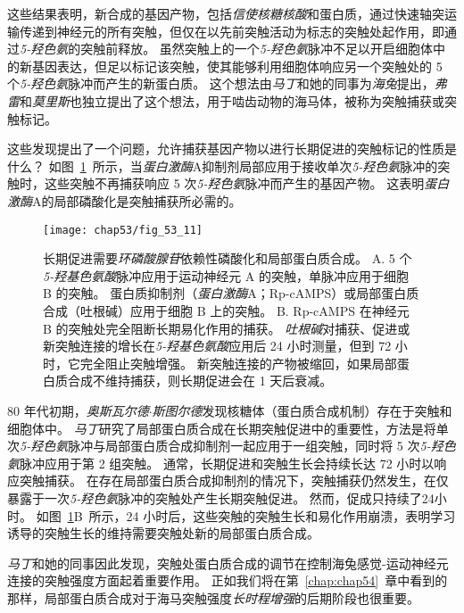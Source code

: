 这些结果表明，新合成的基因产物，包括\textit{信使核糖核酸}和蛋白质，通过快速轴突运输传递到神经元的所有突触，但仅在以先前突触活动为标志的突触处起作用，即通过\textit{5-羟色氨}的突触前释放。
虽然突触上的一个\textit{5-羟色氨}脉冲不足以开启细胞体中的新基因表达，但足以标记该突触，使其能够利用细胞体响应另一个突触处的 5 个\textit{5-羟色氨}脉冲而产生的新蛋白质。
这个想法由\textit{马丁}和她的同事为\textit{海兔}提出，\textit{弗雷}和\textit{莫里斯}也独立提出了这个想法，用于啮齿动物的海马体，被称为突触捕获或突触标记。


这些发现提出了一个问题，允许捕获基因产物以进行长期促进的突触标记的性质是什么？
如图~\ref{fig:53_11}~所示，当\textit{蛋白激酶}A抑制剂局部应用于接收单次\textit{5-羟色氨}脉冲的突触时，这些突触不再捕获响应 5 次\textit{5-羟色氨}脉冲而产生的基因产物。
这表明\textit{蛋白激酶}A的局部磷酸化是突触捕获所必需的。


\begin{figure}[htbp]
	\centering
	\texttt{[image: chap53/fig\_53\_11]}
	\caption{长期促进需要\textit{环磷酸腺苷}依赖性磷酸化和局部蛋白质合成\cite{casadio1999transient}。
		A. 5 个\textit{5-羟基色氨酸}脉冲应用于运动神经元 A 的突触，单脉冲应用于细胞 B 的突触。
		蛋白质抑制剂（\textit{蛋白激酶}A；Rp-cAMPS）或局部蛋白质合成（吐根碱）应用于细胞 B 上的突触。
		B. Rp-cAMPS 在神经元 B 的突触处完全阻断长期易化作用的捕获。
		\textit{吐根碱}对捕获、促进或新突触连接的增长在\textit{5-羟基色氨酸}应用后 24 小时测量，但到 72 小时，它完全阻止突触增强。
		新突触连接的产物被缩回，如果局部蛋白质合成不维持捕获，则长期促进会在 1 天后衰减。}
	\label{fig:53_11}
\end{figure}


80 年代初期，\textit{奥斯瓦尔德$\cdot$斯图尔德}发现核糖体（蛋白质合成机制）存在于突触和细胞体中。
\textit{马丁}研究了局部蛋白质合成在长期突触促进中的重要性，方法是将单次\textit{5-羟色氨}脉冲与局部蛋白质合成抑制剂一起应用于一组突触，同时将 5 次\textit{5-羟色氨}脉冲应用于第 2 组突触。
通常，长期促进和突触生长会持续长达 72 小时以响应突触捕获。
在存在局部蛋白质合成抑制剂的情况下，突触捕获仍然发生，在仅暴露于一次\textit{5-羟色氨}脉冲的突触处产生长期突触促进。
然而，促成只持续了24小时。
如图~\ref{fig:53_11}B~所示，24 小时后，这些突触的突触生长和易化作用崩溃，表明学习诱导的突触生长的维持需要突触处新的局部蛋白质合成。


\textit{马丁}和她的同事因此发现，突触处蛋白质合成的调节在控制海兔感觉-运动神经元连接的突触强度方面起着重要作用。
正如我们将在第~\ref{chap:chap54}~章中看到的那样，局部蛋白质合成对于海马突触强度\textit{长时程增强}的后期阶段也很重要。


